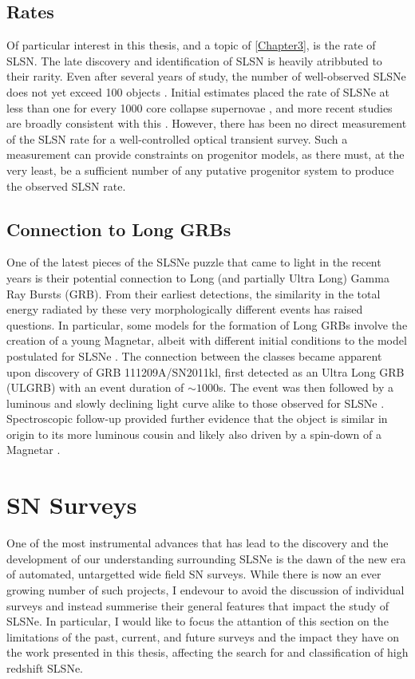 \subsection{Rates}
Of particular interest in this thesis, and a topic of \cref{Chapter3}, is the rate of SLSN. The late discovery and identification of SLSN is heavily atribbuted to their rarity. Even after several years of study, the number of well-observed SLSNe does not yet exceed 100 objects \citep[e.g., see compilations in][]{Inserra2014,Papadopoulus2015,Nicholl2015,DeCia2018}. Initial estimates placed the rate of SLSNe at less than one for every 1000 core collapse supernovae \citep{Quimby2011}, and more recent studies are broadly consistent with this \citep{Quimby2013,McCrum2015}. However, there has been no direct measurement of the SLSN rate for a well-controlled optical transient survey. Such a measurement can provide constraints on progenitor models, as there must, at the very least, be a sufficient number of any putative progenitor system to produce the observed SLSN rate.

\subsection{Connection to Long GRBs}
One of the latest pieces of the SLSNe puzzle that came to light in the recent years is their potential connection to Long (and partially Ultra Long) Gamma Ray Bursts (GRB). From their earliest detections, the similarity in the total energy radiated by these very morphologically different events has raised questions. In particular, some models for the formation of Long GRBs involve the creation of a young Magnetar, albeit with different initial conditions to the model postulated for SLSNe \citep{Margalit2018}. The connection between the classes became apparent upon discovery of GRB 111209A/SN2011kl, first detected as an Ultra Long GRB (ULGRB) with an event duration of $\sim1000$s. The event was then followed by a luminous and slowly declining light curve alike to those observed for SLSNe \citep{Greiner2015}. Spectroscopic follow-up provided further evidence that the object is similar in origin to its more luminous cousin \citep{Mazzali2015} and likely also driven by a spin-down of a Magnetar \citep{Metzger2015}.

\section{SN Surveys}
One of the most instrumental advances that has lead to the discovery and the development of our understanding surrounding SLSNe is the dawn of the new era of automated, untargetted wide field SN surveys. While there is now an ever growing number of such projects, I endevour to avoid the discussion of individual surveys and instead summerise their general features that impact the study of SLSNe. In particular, I would like to focus the attantion of this section on the limitations of the past, current, and future surveys and the impact they have on the work presented in this thesis, affecting the search for and classification of high redshift SLSNe.

